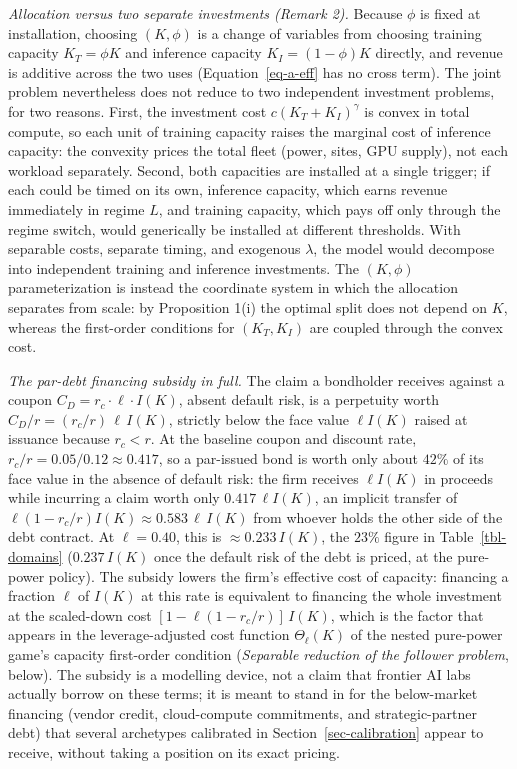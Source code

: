 \documentclass[
  11pt,
  letterpaper,
]{scrartcl}
\begin{document}
\emph{Allocation versus two separate investments (Remark 2).} Because
\(\phi\) is fixed at installation, choosing \((K, \phi)\) is a change of
variables from choosing training capacity \(K_T = \phi K\) and inference
capacity \(K_I = (1-\phi)K\) directly, and revenue is additive across
the two uses (Equation~\ref{eq-a-eff} has no cross term). The joint
problem nevertheless does not reduce to two independent investment
problems, for two reasons. First, the investment cost
\(c(K_T + K_I)^\gamma\) is convex in total compute, so each unit of
training capacity raises the marginal cost of inference capacity: the
convexity prices the total fleet (power, sites, GPU supply), not each
workload separately. Second, both capacities are installed at a single
trigger; if each could be timed on its own, inference capacity, which
earns revenue immediately in regime \(L\), and training capacity, which
pays off only through the regime switch, would generically be installed
at different thresholds. With separable costs, separate timing, and
exogenous \(\lambda\), the model would decompose into independent
training and inference investments. The \((K, \phi)\) parameterization
is instead the coordinate system in which the allocation separates from
scale: by Proposition 1(i) the optimal split does not depend on \(K\),
whereas the first-order conditions for \((K_T, K_I)\) are coupled
through the convex cost.

\emph{The par-debt financing subsidy in full.} The claim a bondholder
receives against a coupon \(C_D = r_c \cdot \ell \cdot I(K)\), absent
default risk, is a perpetuity worth \(C_D/r = (r_c/r)\, \ell\, I(K)\),
strictly below the face value \(\ell I(K)\) raised at issuance because
\(r_c < r\). At the baseline coupon and discount rate,
\(r_c/r = 0.05/0.12 \approx 0.417\), so a par-issued bond is worth only
about \(42\%\) of its face value in the absence of default risk: the
firm receives \(\ell I(K)\) in proceeds while incurring a claim worth
only \(0.417\, \ell I(K)\), an implicit transfer of
\(\ell(1 - r_c/r) I(K) \approx 0.583\, \ell\, I(K)\) from whoever holds
the other side of the debt contract. At \(\ell = 0.40\), this is
\(\approx 0.233\, I(K)\), the \(23\%\) figure in Table~\ref{tbl-domains}
(\(0.237\, I(K)\) once the default risk of the debt is priced, at the
pure-power policy). The subsidy lowers the firm's effective cost of
capacity: financing a fraction \(\ell\) of \(I(K)\) at this rate is
equivalent to financing the whole investment at the scaled-down cost
\([1 - \ell(1 - r_c/r)]\, I(K)\), which is the factor that appears in
the leverage-adjusted cost function \(\Theta_\ell(K)\) of the nested
pure-power game's capacity first-order condition (\emph{Separable
reduction of the follower problem}, below). The subsidy is a modelling
device, not a claim that frontier AI labs actually borrow on these
terms; it is meant to stand in for the below-market financing (vendor
credit, cloud-compute commitments, and strategic-partner debt) that
several archetypes calibrated in Section~\ref{sec-calibration} appear to
receive, without taking a position on its exact pricing.
\end{document}
